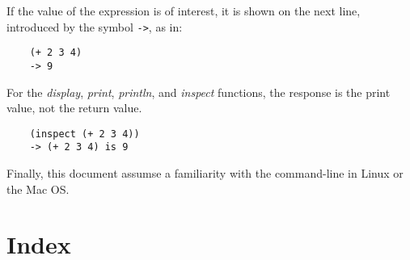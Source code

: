 \documentclass{book}
\begin{document}
If the value of the expression is of interest, it is shown
on the next line, introduced by the symbol \verb!->!, as in:

\begin{verbatim}
    (+ 2 3 4)
    -> 9
\end{verbatim}

For the 
{\it display}, {\it print}, {\it println}, and {\it inspect} functions,
the response is the print value, not the return value.

\begin{verbatim}
    (inspect (+ 2 3 4))
    -> (+ 2 3 4) is 9
\end{verbatim}

Finally, this document assumse a familiarity with the command-line in
Linux or the Mac OS.














%
%
%
%
%
%
%
%
%
%
%
%

\T\printindex
\W\chapter*{Index}
\W\htmlprintindex
\end{document}
